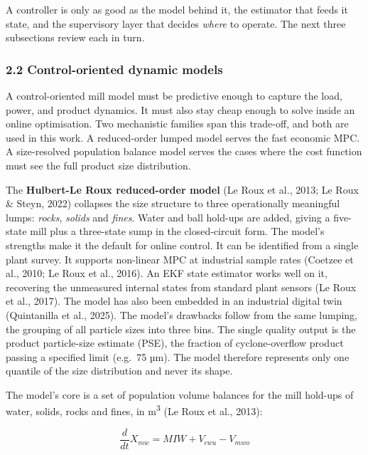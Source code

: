 \documentclass[
  14pt,
]{extarticle}
\begin{document}
A controller is only as good as the model behind it, the estimator that
feeds it state, and the supervisory layer that decides \emph{where} to
operate. The next three subsections review each in turn.

\subsubsection{2.2 Control-oriented dynamic
models}\label{control-oriented-dynamic-models}

A control-oriented mill model must be predictive enough to capture the
load, power, and product dynamics. It must also stay cheap enough to
solve inside an online optimisation. Two mechanistic families span this
trade-off, and both are used in this work. A reduced-order lumped model
serves the fast economic MPC. A size-resolved population balance model
serves the cases where the cost function must see the full product size
distribution.

The \textbf{Hulbert-Le Roux reduced-order model} (Le Roux et al., 2013;
Le Roux \& Steyn, 2022) collapses the size structure to three
operationally meaningful lumps: \emph{rocks}, \emph{solids} and
\emph{fines}. Water and ball hold-ups are added, giving a five-state
mill plus a three-state sump in the closed-circuit form. The model's strengths
make it the default for online control. It can be identified from a
single plant survey. It supports non-linear MPC at industrial sample
rates (Coetzee et al., 2010; Le Roux et al., 2016). An EKF state
estimator works well on it, recovering the unmeasured internal states
from standard plant sensors (Le Roux et al., 2017). The model has also
been embedded in an industrial digital twin (Quintanilla et al., 2025).
The model's drawbacks follow from the same lumping, the grouping of
all particle sizes into three bins. The single quality output is
the product particle-size estimate (PSE), the fraction of
cyclone-overflow product passing a specified limit (e.g.~75 µm). The
model therefore represents only one quantile of the size distribution
and never its shape.

The model's core is a set of population volume balances for the mill hold-ups of
water, solids, rocks and fines, in m\textsuperscript{3} (Le Roux et al.,
2013):

\begingroup\small

\begin{equation}\frac{d}{dt}X_{mw}=MIW+V_{cwu}-V_{mwo}\tag{1a}\end{equation}
\end{document}
